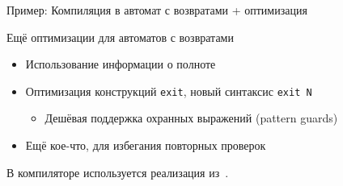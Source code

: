 \documentclass[aspectratio=169
  , xcolor={svgnames}
  , hyperref={ colorlinks,citecolor=Blue
             , linkcolor=DarkRed,urlcolor=DarkBlue}
  , russian
  ]{beamer}
\begin{document}
\begin{frame}[fragile]{Пример: Компиляция в автомат с возвратами + оптимизация}
\begin{minipage}[t]{0.45\linewidth}\vspace{0pt}
\vspace{1cm}
\end{minipage}\hspace{.5cm}
\begin{minipage}[t]{0.45\linewidth}\vspace{0pt}
\begin{minipage}{0.44\linewidth}
\end{minipage}
\end{minipage}
\end{frame}


\begin{frame}{Ещё оптимизации для автоматов с возвратами}
\begin{itemize}
\item Использование информации о полноте
\item Оптимизация конструкций \lstinline[language=ocamllambda]{exit}, новый синтаксис \lstinline[language=ocamllambda]{exit N}
\begin{itemize}
\item Дешёвая поддержка охранных выражений (pattern guards)
\end{itemize}
\item Ещё кое-что, для избегания повторных проверок
\end{itemize}
\vspace{2em}
В компиляторе \OCaml{}  используется  реализация из~\cite{maranget2001}.
\end{frame}
\end{document}
